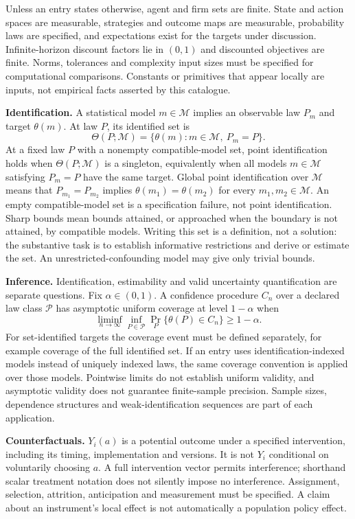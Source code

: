 \documentclass[11pt,a4paper]{article}
\begin{document}
Unless an entry states otherwise, agent and firm sets are finite. State and action spaces are measurable, strategies and outcome maps are measurable, probability laws are specified, and expectations exist for the targets under discussion. Infinite-horizon discount factors lie in $(0,1)$ and discounted objectives are finite. Norms, tolerances and complexity input sizes must be specified for computational comparisons. Constants or primitives that appear locally are inputs, not empirical facts asserted by this catalogue.

\textbf{Identification.} A statistical model $m\in\mathcal M$ implies an observable law $P_m$ and target $\theta(m)$. At law $P$, its identified set is
\[
\Theta(P;\mathcal M)=\{\theta(m):m\in\mathcal M,\ P_m=P\}.
\]
At a fixed law $P$ with a nonempty compatible-model set, point identification holds when $\Theta(P;\mathcal M)$ is a singleton, equivalently when all models $m\in\mathcal M$ satisfying $P_m=P$ have the same target. Global point identification over $\mathcal M$ means that $P_{m_1}=P_{m_2}$ implies $\theta(m_1)=\theta(m_2)$ for every $m_1,m_2\in\mathcal M$. An empty compatible-model set is a specification failure, not point identification. Sharp bounds mean bounds attained, or approached when the boundary is not attained, by compatible models. Writing this set is a definition, not a solution: the substantive task is to establish informative restrictions and derive or estimate the set. An unrestricted-confounding model may give only trivial bounds.

\textbf{Inference.} Identification, estimability and valid uncertainty quantification are separate questions. Fix $\alpha\in(0,1)$. A confidence procedure $C_n$ over a declared law class $\mathcal P$ has asymptotic uniform coverage at level $1-\alpha$ when
\[
\liminf_{n\to\infty}\inf_{P\in\mathcal P}\Pr_P\{\theta(P)\in C_n\}\geq1-\alpha.
\]
For set-identified targets the coverage event must be defined separately, for example coverage of the full identified set. If an entry uses identification-indexed models instead of uniquely indexed laws, the same coverage convention is applied over those models. Pointwise limits do not establish uniform validity, and asymptotic validity does not guarantee finite-sample precision. Sample sizes, dependence structures and weak-identification sequences are part of each application.

\textbf{Counterfactuals.} $Y_i(a)$ is a potential outcome under a specified intervention, including its timing, implementation and versions. It is not $Y_i$ conditional on voluntarily choosing $a$. A full intervention vector permits interference; shorthand scalar treatment notation does not silently impose no interference. Assignment, selection, attrition, anticipation and measurement must be specified. A claim about an instrument's local effect is not automatically a population policy effect.
\end{document}
